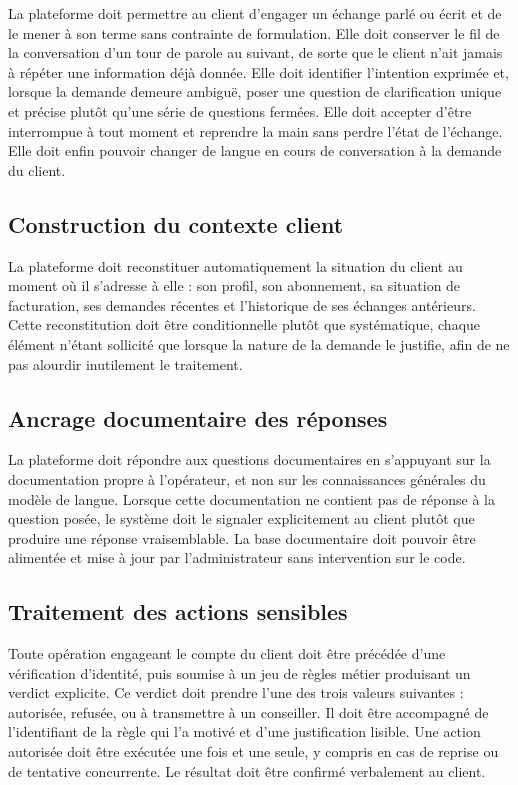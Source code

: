 La plateforme doit permettre au client d'engager un échange parlé ou écrit et de le mener à son terme sans contrainte de formulation. Elle doit conserver le fil de la conversation d'un tour de parole au suivant, de sorte que le client n'ait jamais à répéter une information déjà donnée. Elle doit identifier l'intention exprimée et, lorsque la demande demeure ambiguë, poser une question de clarification unique et précise plutôt qu'une série de questions fermées. Elle doit accepter d'être interrompue à tout moment et reprendre la main sans perdre l'état de l'échange. Elle doit enfin pouvoir changer de langue en cours de conversation à la demande du client.

\subsection{Construction du contexte client}

La plateforme doit reconstituer automatiquement la situation du client au moment où il s'adresse à elle : son profil, son abonnement, sa situation de facturation, ses demandes récentes et l'historique de ses échanges antérieurs. Cette reconstitution doit être conditionnelle plutôt que systématique, chaque élément n'étant sollicité que lorsque la nature de la demande le justifie, afin de ne pas alourdir inutilement le traitement.

\subsection{Ancrage documentaire des réponses}

La plateforme doit répondre aux questions documentaires en s'appuyant sur la documentation propre à l'opérateur, et non sur les connaissances générales du modèle de langue. Lorsque cette documentation ne contient pas de réponse à la question posée, le système doit le signaler explicitement au client plutôt que produire une réponse vraisemblable. La base documentaire doit pouvoir être alimentée et mise à jour par l'administrateur sans intervention sur le code.

\subsection{Traitement des actions sensibles}

Toute opération engageant le compte du client doit être précédée d'une vérification d'identité, puis soumise à un jeu de règles métier produisant un verdict explicite. Ce verdict doit prendre l'une des trois valeurs suivantes : autorisée, refusée, ou à transmettre à un conseiller. Il doit être accompagné de l'identifiant de la règle qui l'a motivé et d'une justification lisible. Une action autorisée doit être exécutée une fois et une seule, y compris en cas de reprise ou de tentative concurrente. Le résultat doit être confirmé verbalement au client.

